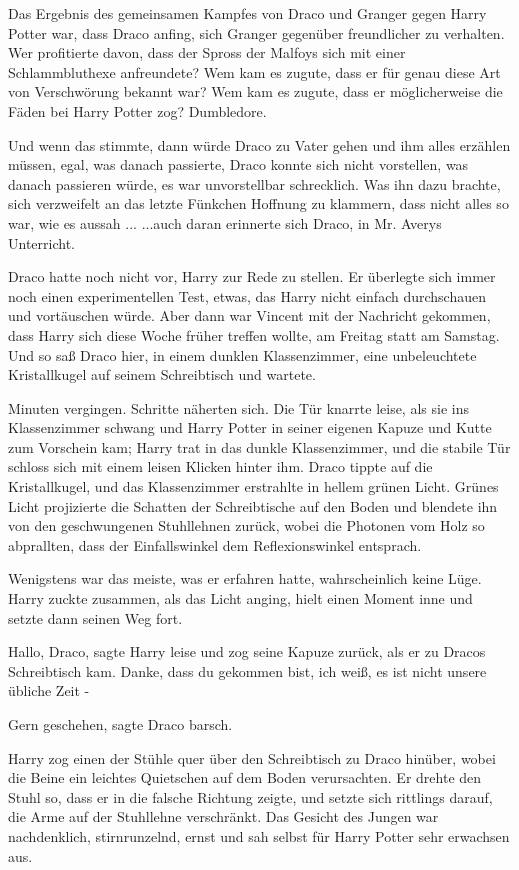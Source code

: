 Das Ergebnis des gemeinsamen Kampfes von Draco und Granger gegen Harry Potter
war, dass Draco anfing, sich Granger gegenüber freundlicher zu verhalten. Wer
profitierte davon, dass der Spross der Malfoys sich mit einer Schlammbluthexe
anfreundete? Wem kam es zugute, dass er für genau diese Art von Verschwörung
bekannt war? Wem kam es zugute, dass er möglicherweise die Fäden bei Harry
Potter zog? Dumbledore.

Und wenn das stimmte, dann würde Draco zu Vater gehen und ihm alles erzählen
müssen, egal, was danach passierte, Draco konnte sich nicht vorstellen, was
danach passieren würde, es war unvorstellbar schrecklich. Was ihn dazu brachte,
sich verzweifelt an das letzte Fünkchen Hoffnung zu klammern, dass nicht alles
so war, wie es aussah ... ...auch daran erinnerte sich Draco, in Mr. Averys
Unterricht.

Draco hatte noch nicht vor, Harry zur Rede zu stellen. Er überlegte sich immer
noch einen experimentellen Test, etwas, das Harry nicht einfach durchschauen und
vortäuschen würde. Aber dann war Vincent mit der Nachricht gekommen, dass Harry
sich diese Woche früher treffen wollte, am Freitag statt am Samstag. Und so saß
Draco hier, in einem dunklen Klassenzimmer, eine unbeleuchtete Kristallkugel auf
seinem Schreibtisch und wartete.

Minuten vergingen. Schritte näherten sich. Die Tür knarrte leise, als sie ins
Klassenzimmer schwang und Harry Potter in seiner eigenen Kapuze und Kutte zum
Vorschein kam; Harry trat in das dunkle Klassenzimmer, und die stabile Tür
schloss sich mit einem leisen Klicken hinter ihm. Draco tippte auf die
Kristallkugel, und das Klassenzimmer erstrahlte in hellem grünen Licht. Grünes
Licht projizierte die Schatten der Schreibtische auf den Boden und blendete ihn
von den geschwungenen Stuhllehnen zurück, wobei die Photonen vom Holz so
abprallten, dass der Einfallswinkel dem Reflexionswinkel entsprach.

Wenigstens war das meiste, was er erfahren hatte, wahrscheinlich keine Lüge.
Harry zuckte zusammen, als das Licht anging, hielt einen Moment inne und setzte
dann seinen Weg fort.

\glqq{}Hallo, Draco\grqq{}, sagte Harry leise und zog seine Kapuze zurück, als er
zu Dracos Schreibtisch kam. \glqq{}Danke, dass du gekommen bist, ich weiß, es ist
nicht unsere übliche Zeit -\grqq{}

\glqq{}Gern geschehen\grqq{}, sagte Draco barsch.

Harry zog einen der Stühle quer über den Schreibtisch zu Draco hinüber, wobei
die Beine ein leichtes Quietschen auf dem Boden verursachten. Er drehte den
Stuhl so, dass er in die falsche Richtung zeigte, und setzte sich rittlings
darauf, die Arme auf der Stuhllehne verschränkt. Das Gesicht des Jungen war
nachdenklich, stirnrunzelnd, ernst und sah selbst für Harry Potter sehr
erwachsen aus.

